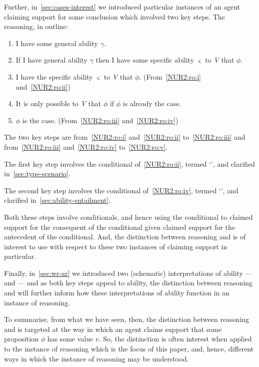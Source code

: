 \begin{note}
  Further, in~\autoref{sec:cases-interest} we introduced particular instances of an agent claiming support for some conclusion which involved two key steps.
  The reasoning, in outline:
  \begin{enumerate}[label=\arabic*., ref=(\arabic*)]
  \item\label{NUR2:ro:i} I have some general ability \(\gamma\).
  \item\label{NUR2:ro:ii} If I have general ability \(\gamma\) then I have some specific ability \(\varsigma\) to \emph{V} that \(\phi\).
  \item\label{NUR2:ro:iii} I have the specific ability \(\varsigma\) to \emph{V} that \(\phi\). \hfill (From~\ref{NUR2:ro:i} and~\ref{NUR2:ro:ii})
  \item\label{NUR2:ro:iv} It is only possible to \emph{V} that \(\phi\) if \(\phi\) is already the case.
  \item\label{NUR2:ro:v} \(\phi\) is the case. \hfill (From~\ref{NUR2:ro:iii} and~\ref{NUR2:ro:iv})
  \end{enumerate}

  The two key steps are from~\ref{NUR2:ro:i} and~\ref{NUR2:ro:ii} to~\ref{NUR2:ro:iii} and from~\ref{NUR2:ro:iii} and~\ref{NUR2:ro:iv} to~\ref{NUR2:ro:v}.

  The first key step involves the conditional of~\ref{NUR2:ro:ii}, termed `\gsi{-}', and clarified in~\autoref{sec:type-scenario}.

  The second key step involves the conditional of~\ref{NUR2:ro:iv}, termed `', and clarified in~\autoref{sec:ability-entailment}.

  Both these steps involve conditionals, and hence using the conditional to claimed support for the consequent of the conditional given claimed support for the antecedent of the conditional.
  And, the distinction between reasoning \ur{} and \nr{} is of interest to use with respect to these two instances of claiming support in particular.

  Finally, in~\autoref{sec:wr-ar} we introduced two (schematic) interpretations of ability --- \AR{} and \WR{} --- and as both key steps appeal to ability, the distinction between reasoning \ur{} and \nr{} will further inform how these interpretations of ability function in an instance of reasoning.
\end{note}

\begin{note}
  To summarise, from what we have seen, then, the distinction between reasoning \ur{} and \nr{} is targeted at the way in which an agent claims support that some proposition \(\phi\) has some value \(v\).
  So, the distinction is often interest when applied to the instance of reasoning which is the focus of this paper, and, hence, different ways in which the instance of reasoning may be understood.
\end{note}

